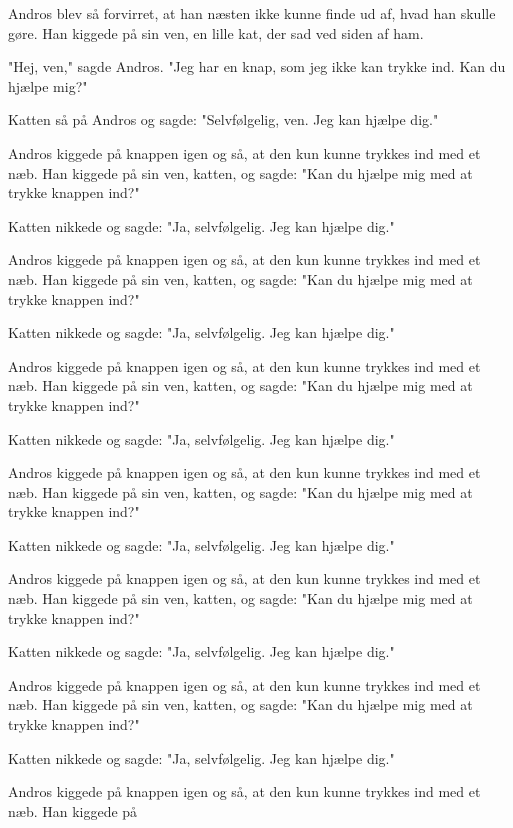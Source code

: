 \documentclass[10pt]{article}
\begin{document}
{\begin{minipage}{\textwidth}
\par\smallskip
Andros blev så forvirret, at han næsten ikke kunne finde ud af, hvad han skulle gøre. Han kiggede på sin ven, en lille kat, der sad ved siden af ham.
\par\smallskip
"Hej, ven," sagde Andros. "Jeg har en knap, som jeg ikke kan trykke ind. Kan du hjælpe mig?"
\par\smallskip
Katten så på Andros og sagde: "Selvfølgelig, ven. Jeg kan hjælpe dig."
\par\smallskip
Andros kiggede på knappen igen og så, at den kun kunne trykkes ind med et næb. Han kiggede på sin ven, katten, og sagde: "Kan du hjælpe mig med at trykke knappen ind?"
\par\smallskip
Katten nikkede og sagde: "Ja, selvfølgelig. Jeg kan hjælpe dig."
\par\smallskip
Andros kiggede på knappen igen og så, at den kun kunne trykkes ind med et næb. Han kiggede på sin ven, katten, og sagde: "Kan du hjælpe mig med at trykke knappen ind?"
\par\smallskip
Katten nikkede og sagde: "Ja, selvfølgelig. Jeg kan hjælpe dig."
\par\smallskip
Andros kiggede på knappen igen og så, at den kun kunne trykkes ind med et næb. Han kiggede på sin ven, katten, og sagde: "Kan du hjælpe mig med at trykke knappen ind?"
\par\smallskip
Katten nikkede og sagde: "Ja, selvfølgelig. Jeg kan hjælpe dig."
\par\smallskip
Andros kiggede på knappen igen og så, at den kun kunne trykkes ind med et næb. Han kiggede på sin ven, katten, og sagde: "Kan du hjælpe mig med at trykke knappen ind?"
\par\smallskip
Katten nikkede og sagde: "Ja, selvfølgelig. Jeg kan hjælpe dig."
\par\smallskip
Andros kiggede på knappen igen og så, at den kun kunne trykkes ind med et næb. Han kiggede på sin ven, katten, og sagde: "Kan du hjælpe mig med at trykke knappen ind?"
\par\smallskip
Katten nikkede og sagde: "Ja, selvfølgelig. Jeg kan hjælpe dig."
\par\smallskip
Andros kiggede på knappen igen og så, at den kun kunne trykkes ind med et næb. Han kiggede på sin ven, katten, og sagde: "Kan du hjælpe mig med at trykke knappen ind?"
\par\smallskip
Katten nikkede og sagde: "Ja, selvfølgelig. Jeg kan hjælpe dig."
\par\smallskip
Andros kiggede på knappen igen og så, at den kun kunne trykkes ind med et næb. Han kiggede på\par\smallskip

\end{minipage}}
\end{document}
